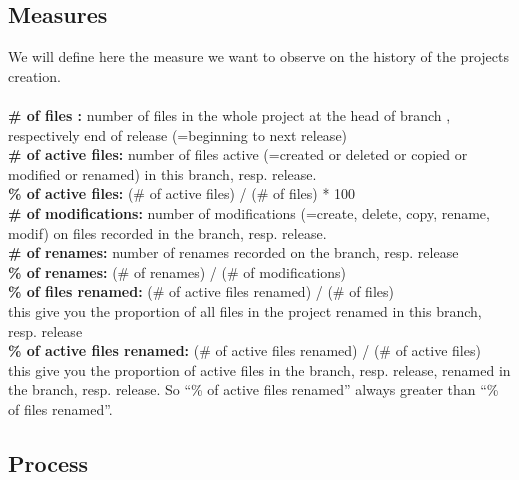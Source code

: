 \subsection{Measures}
We will define here the measure we want to observe on the history of the projects creation.\\\\	
\textbf{\# of files :} number of files in the whole project at the head of branch , respectively end of release (=beginning to next release)\\
\textbf{\# of active files:} number of files active (=created or deleted or copied or modified or renamed) in this branch, resp. release.\\
\textbf{\% of active files:} (\# of active files) / (\# of files) * 100 \\
\textbf{\# of modifications:}  number of modifications (=create, delete, copy, rename, modif) on files recorded in the branch, resp. release.\\
\textbf{\# of renames:} number of renames recorded on the branch, resp. release\\
\textbf{\% of renames:} (\# of renames) / (\# of modifications) \\
\textbf{\% of files renamed:} (\# of active files renamed) / (\# of files)\\
this give you the proportion of all files in the project renamed in this branch, resp. release\\
\textbf{\% of active files renamed:}  (\# of active files renamed) / (\# of active files)\\
this give you the proportion of active files in the branch, resp. release, renamed in the branch, resp. release. So “\% of active files renamed” always greater than “\% of files renamed”. \\
\label{subsec:Measures}

\subsection{Process}

